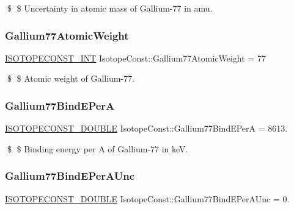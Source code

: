 \$ \$ Uncertainty in atomic mass of Gallium-\/77 in amu. \mbox{\label{group___isotope_const-_gallium-_ga77_ga28fc670015a06448704d903a8af04813}} 
\subsubsection{\texorpdfstring{Gallium77\+Atomic\+Weight}{Gallium77AtomicWeight}}
{\footnotesize\ttfamily \mbox{\hyperlink{group___isotope_const-_macros_ga5f18360b3e99483a35c32d789e62621c}{I\+S\+O\+T\+O\+P\+E\+C\+O\+N\+S\+T\+\_\+\+I\+NT}} Isotope\+Const\+::\+Gallium77\+Atomic\+Weight = 77}

\$ \$ Atomic weight of Gallium-\/77. \mbox{\label{group___isotope_const-_gallium-_ga77_ga1e5ec890c41c557da0ba2d16845a37c8}} 
\subsubsection{\texorpdfstring{Gallium77\+Bind\+E\+PerA}{Gallium77BindEPerA}}
{\footnotesize\ttfamily \mbox{\hyperlink{group___isotope_const-_macros_ga8f45a7272ce02c0b4c65c44636ed719a}{I\+S\+O\+T\+O\+P\+E\+C\+O\+N\+S\+T\+\_\+\+D\+O\+U\+B\+LE}} Isotope\+Const\+::\+Gallium77\+Bind\+E\+PerA = 8613.}

\$ \$ Binding energy per A of Gallium-\/77 in keV. \mbox{\label{group___isotope_const-_gallium-_ga77_gaaf05027fcda0bbb445be30647436b8e1}} 
\subsubsection{\texorpdfstring{Gallium77\+Bind\+E\+Per\+A\+Unc}{Gallium77BindEPerAUnc}}
{\footnotesize\ttfamily \mbox{\hyperlink{group___isotope_const-_macros_ga8f45a7272ce02c0b4c65c44636ed719a}{I\+S\+O\+T\+O\+P\+E\+C\+O\+N\+S\+T\+\_\+\+D\+O\+U\+B\+LE}} Isotope\+Const\+::\+Gallium77\+Bind\+E\+Per\+A\+Unc = 0.}

